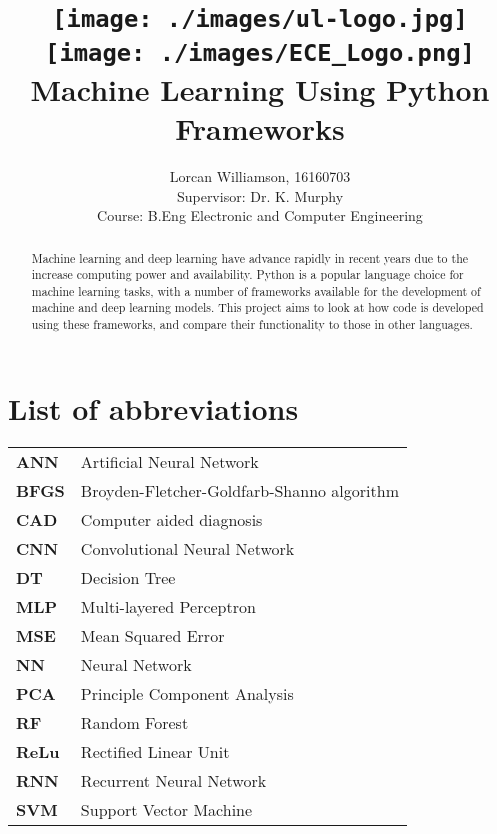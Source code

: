 \documentclass[12pt,a4paper,titlepage,twoside]{report}
\title{
  \texttt{[image: ./images/ul-logo.jpg]}
  \hspace{1cm}
  \texttt{[image: ./images/ECE\_Logo.png]}
  Machine Learning Using Python Frameworks
}
\author{Lorcan Williamson, 16160703\\Supervisor: Dr. K. Murphy\\Course: B.Eng Electronic and Computer Engineering}
\begin{document}
\maketitle

\begin{abstract}
	Machine learning and deep learning have advance rapidly in recent years due to the increase computing power and availability. Python is a popular language choice for machine learning tasks, with a number of frameworks available for the development of machine and deep learning models. This project aims to look at how code is developed using these frameworks, and compare their functionality to those in other languages.
\end{abstract}

\tableofcontents
\newpage

\chapter*{List of abbreviations}
	\begin{minipage}[t]{\textwidth}
		\begin{minipage}{0.45\textwidth}
		\begin{tabular}{l p{5.5cm}}

			\textbf{ANN}	& Artificial Neural Network \\
			\textbf{BFGS} 	& Broyden-Fletcher-Goldfarb-Shanno algorithm \\
			\textbf{CAD}	& Computer aided diagnosis \\
			\textbf{CNN} 	& Convolutional Neural Network \\
			\textbf{DT}  	& Decision Tree \\
			\textbf{MLP} 	& Multi-layered Perceptron \\
			\textbf{MSE} 	& Mean Squared Error \\
			\textbf{NN}  	& Neural Network \\
			\textbf{PCA} 	& Principle Component Analysis \\
			\textbf{RF}  	& Random Forest \\
			\textbf{ReLu} 	& Rectified Linear Unit \\
			\textbf{RNN}	& Recurrent Neural Network \\
			\textbf{SVM} 	& Support Vector Machine \\
					
		\end{tabular}
		\end{minipage}%
	\hspace{0.5cm}%
	\begin{minipage}{0.45\textwidth}
	
	\end{minipage}
	
	\end{minipage}
\end{document}
